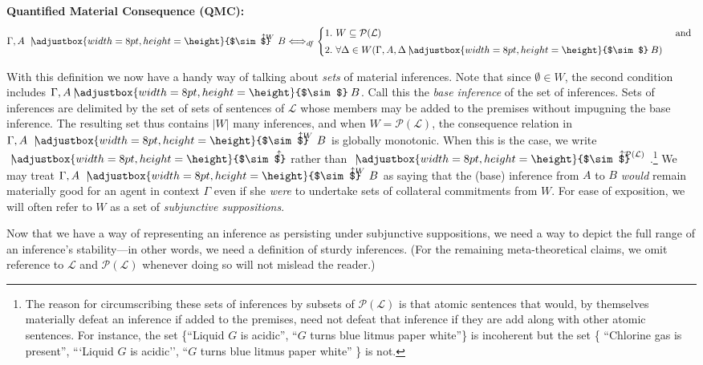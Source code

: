 \documentclass{svjour3}                     %
\newcommand{\ssim}{%
     \setbox0=\hbox{$\sim$}%
     \adjustbox{width=8pt,height=\height}{$\sim$}
}
\newcommand{\uuparrow}{%
     \setbox0=\hbox{$\scriptstyle\uparrow$}%
     \raisebox{.2ex}{$\scriptstyle\uparrow$}
}
\newcommand{\nmc}{\mathbin{\mid\joinrel\!\!\ssim}}
\newcommand{\qmc}[4][\Gamma,]{{#1#2\,\,\mathrel{\nmc}}^{\!\!\!\!\!\!\!\uuparrow\scriptstyle #4}\,\,#3}
\newcommand{\mqmc}[3][\Gamma,]{{#1#2\,\,\mathrel{\nmc}}^{\!\!\!\!\!\!\uuparrow}\,\,#3}
\begin{document}
\noindent\textbf{Quantified Material Consequence (QMC):}
		\begin{equation}
              \qmc{A}{B}{W} \Longleftrightarrow_{df}
				      \begin{cases}\nonumber
				        1.\,\, W\subseteq\mathcal{P}(\mathcal{L}) & $ and $ \\[3pt] 
						2.\,\, \forall\Delta\in W(\Gamma, A,  \Delta \nmc B ) 
						\end{cases}
		\end{equation}
		

With this definition we now have a handy way of talking about \textit{sets} of material inferences. Note that since $ \emptyset \in W $, the second condition includes $ \Gamma, A \nmc B $. Call this the \textit{base inference} of the set of inferences. Sets of inferences are delimited by the set of sets of sentences of $ \mathcal{L} $ whose members may be added to the premises without impugning the base inference. The resulting set thus contains $ |W| $ many inferences,  and when $ W = \mathcal{P}(\mathcal{L}) $, the consequence relation in $\qmc{A}{B}{W} $ is globally monotonic. When this is the case, we write $ \mqmc[]{}{} $  rather than $ \qmc[]{}{}{ \mathcal{P}(\mathcal{L}) }$.\footnote{The reason for circumscribing these sets of inferences by subsets of $ \mathcal{P}(\mathcal{L}) $ is that atomic sentences that would, by themselves materially defeat an inference if added to the premises, need not defeat that inference if they are add along with other atomic sentences. For instance, the set \{``Liquid $ G $ is acidic'', ``$ G $ turns blue litmus paper white''\} is incoherent but the set \{ ``Chlorine gas is present'', ```Liquid $ G $ is acidic'', ``$ G $ turns blue litmus paper white'' \}  is not.} We may treat $ \qmc{A}{B}{W}  $ as saying that the (base) inference from $ A $ to $ B $ \textit{would} remain materially good for an agent in context $ \Gamma $ even if she \textit{were} to undertake sets of collateral commitments from $ W $. For ease of exposition, we will often refer to $W$ as a set of \textit{subjunctive suppositions}.

Now that we have a way of representing an inference as persisting under subjunctive suppositions, we need a way to depict the full range of an inference's stability---in other words, we need a definition of sturdy inferences. (For the remaining meta-theoretical claims, we omit reference to $\mathcal{L}$ and $\mathcal{P}(\mathcal{L})$ whenever doing so will not mislead the reader.) \newline
\end{document}
